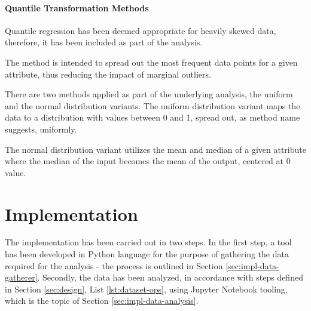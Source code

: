 \paragraph{Quantile Transformation Methods} \label{sec:data-modelling:scalers:quantile}
Quantile regression has been deemed appropriate for heavily skewed data\cite{quantileNormalizationInSkewedDataAnalysis}, therefore, it has been included as part of the analysis.

The method is intended to spread out the most frequent data points for a given attribute, thus reducing the impact of marginal outliers.

There are two methods applied as part of the underlying analysis, the uniform and the normal distribution variants. The uniform distribution variant maps the data to a distribution with values between 0 and 1, spread out, as method name suggests, uniformly.

The normal distribution variant utilizes the mean and median of a given attribute where the median of the input becomes the mean of the output, centered at 0 value. 
\section{Implementation}\label{sec:implementation}
The implementation has been carried out in two steps. In the first step, a tool has been developed in Python language for the purpose of gathering the data required for the analysis - the process is outlined in Section \ref{sec:impl-data-gatherer}. Secondly, the data has been analyzed, in accordance with steps defined in Section \ref{sec:design}, List \ref{lst:dataset-ops}, using Jupyter Notebook tooling, which is the topic of Section \ref{sec:impl-data-analysis}.









